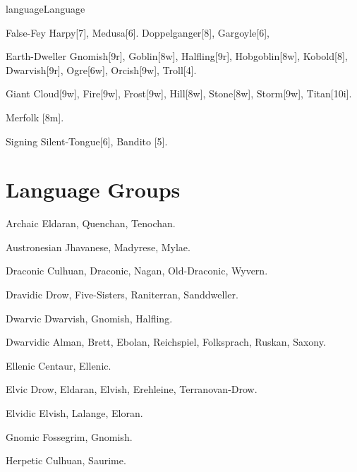 \begin{Skill}[2.1]{language}{Language}
\begin{Description}
\item[False-Fey] Harpy[7], Medusa[6].  Doppelganger[8], Gargoyle[6],

\item[Earth-Dweller] Gnomish[9r], Goblin[8w], Halfling[9r],
  Hobgoblin[8w], Kobold[8], Dwarvish[9r], Ogre[6w], Orcish[9w],
  Troll[4].

\item[Giant] Cloud[9w], Fire[9w], Frost[9w], Hill[8w], Stone[8w],
  Storm[9w], Titan[10i].

\item[Merfolk] [8m]. 

\item[Signing] Silent-Tongue[6], Bandito [5]. 
  
\end{Description}

\section{Language Groups}
\label{languages:groups}

\begin{Description}

\item[Archaic] Eldaran, Quenchan, Tenochan.

\item[Austronesian] Jhavanese, Madyrese, Mylae. 

\item[Draconic] Culhuan, Draconic, Nagan, Old-Draconic, Wyvern.

\item[Dravidic] Drow, Five-Sisters, Raniterran, Sanddweller.

\item[Dwarvic] Dwarvish, Gnomish, Halfling.

\item[Dwarvidic] Alman, Brett, Ebolan, Reichspiel, Folksprach, Ruskan,
  Saxony.

\item[Ellenic] Centaur, Ellenic.

\item[Elvic] Drow, Eldaran, Elvish, Erehleine, Terranovan-Drow.

\item[Elvidic] Elvish, Lalange, Eloran.  

\item[Gnomic] Fossegrim, Gnomish.  

\item[Herpetic] Culhuan, Saurime. 


\end{Description}
\end{Skill}
